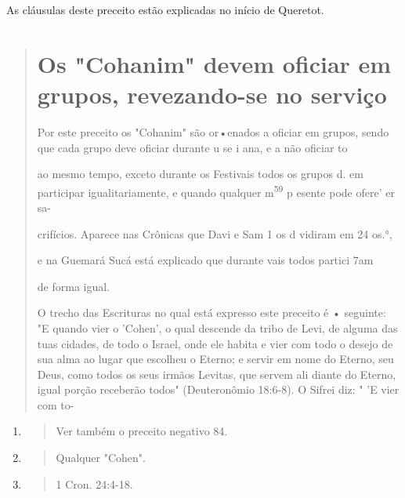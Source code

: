 As cláusulas deste preceito estão explicadas no início de Queretot.

\begin{quote}
\section{Os "Cohanim" devem oficiar em grupos, revezando-se no serviço}

Por este preceito os "Cohanim" são or•enados a oficiar em grupos, sendo
que cada grupo deve oficiar durante u se i ana, e a não oficiar to

ao mesmo tempo, exceto durante os Festivais todos os grupos d. em\\
participar igualitariamente, e quando qualquer m\textsuperscript{59} p
esente pode ofere' er sa-

crifícios. Aparece nas Crônicas que Davi e Sam 1 os d vidiram em 24
os.°,

e na Guemará Sucá está explicado que durante vais todos partici 7am

de forma igual.

O trecho das Escrituras no qual está expresso este preceito é •
se­guinte: "E quando vier o 'Cohen', o qual descende da tribo de Levi,
de alguma das tuas cidades, de todo o Israel, onde ele habita e vier com
todo o desejo de sua alma ao lugar que escolheu o Eterno; e servir em
nome do Eterno, seu Deus, como todos os seus irmãos Levitas, que servem
ali diante do Eterno, igual porção receberão todos" (Deuteronômio
18:6-8). O Sifrei diz: " 'E vier com to-
\end{quote}

\begin{enumerate}
\def\labelenumi{\arabic{enumi}.}
\setcounter{enumi}{57}
\item
 \begin{quote}
 Ver também o preceito negativo 84.
 \end{quote}
\item
 \begin{quote}
 Qualquer "Cohen".
 \end{quote}
\item
 \begin{quote}
 1 Cron. 24:4-18.
 \end{quote}
\end{enumerate}

